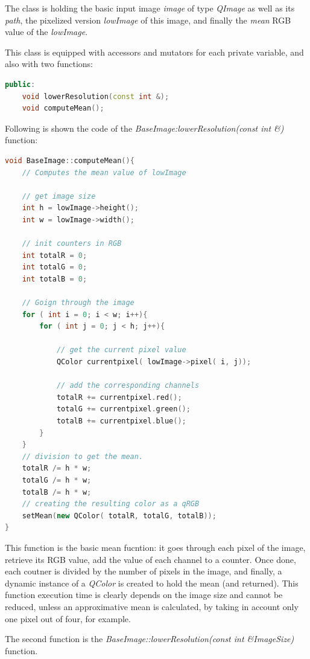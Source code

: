 \documentclass[aps,letterpaper,11pt]{revtex4}
\begin{document}
The class is holding the basic input image \textit{image} of type \textit{QImage} as well as its \textit{path}, the pixelized version \textit{lowImage} of this image, and finally the \textit{mean} RGB value of the \textit{lowImage}.

This class is equipped with accessors and mutators for each private variable, and also with two functions:

\begin{lstlisting}[language=C++]
public:
    void lowerResolution(const int &);
    void computeMean();
\end{lstlisting}

Following is shown the code of the \textit{BaseImage:lowerResolution(const int \&)} function:
 
\begin{lstlisting}[language=C++]
void BaseImage::computeMean(){
    // Computes the mean value of lowImage

    // get image size
    int h = lowImage->height();
    int w = lowImage->width();

    // init counters in RGB
    int totalR = 0;
    int totalG = 0;
    int totalB = 0;

    // Goign through the image
    for ( int i = 0; i < w; i++){
        for ( int j = 0; j < h; j++){

            // get the current pixel value
            QColor currentpixel( lowImage->pixel( i, j));

            // add the corresponding channels
            totalR += currentpixel.red();
            totalG += currentpixel.green();
            totalB += currentpixel.blue();
        }
    }
    // division to get the mean.
    totalR /= h * w;
    totalG /= h * w;
    totalB /= h * w;
    // creating the resulting color as a qRGB
    setMean(new QColor( totalR, totalG, totalB));
}
\end{lstlisting}

This function is the basic mean fucntion: it goes through each pixel of the image, retrieve its RGB value, add the value of each channel to a counter. Once done, each coutner is divided by the number of pixels in the image, and finally, a dynamic instance of a \textit{QColor} is created to hold the mean (and returned).
This function execution time is clearly depends on the image size and cannot be reduced, unless an approximative mean is calculated, by taking in account only one pixel out of four, for example.

The second function is the \textit{BaseImage::lowerResolution(const int \&ImageSize)} function.
 
\end{document}
